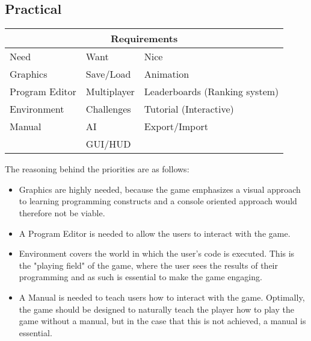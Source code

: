 \subsection*{Practical}
\begin{tabular}{|l|l|l|}
\hline
\multicolumn{3}{|c|}{Requirements}\\
\hline
Need & Want & Nice\\
\hline
Graphics & Save/Load & Animation\\
Program Editor & Multiplayer & Leaderboards (Ranking system)\\
Environment & Challenges & Tutorial (Interactive)\\
Manual & AI & Export/Import\\
 & GUI/HUD & \\
\hline
\end{tabular}

The reasoning behind the priorities are as follows:
\begin{itemize}
\item Graphics are highly needed, because the game emphasizes a visual approach to learning programming constructs and a console oriented approach would therefore not be viable.

\item A Program Editor is needed to allow the users to interact with the game.

\item Environment covers the world in which the user's code is executed. This is the "playing field" of the game, where the user sees the results of their programming and as such is essential to make the game engaging.

\item A Manual is needed to teach users how to interact with the game. Optimally, the game should be designed to naturally teach the player how to play the game without a manual, but in the case that this is not achieved, a manual is essential.
\end{itemize}

